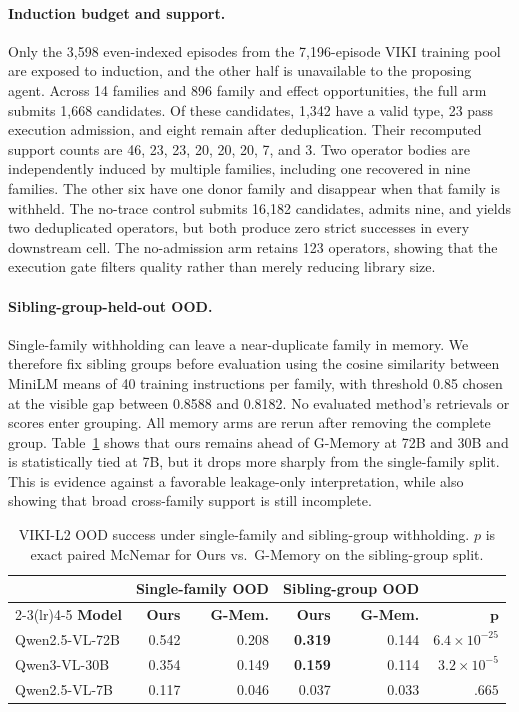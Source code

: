 \documentclass{article}
\theoremstyle{plain}
\theoremstyle{definition}
\theoremstyle{remark}
\begin{document}
\paragraph{Induction budget and support.}
Only the 3{,}598 even-indexed episodes from the 7{,}196-episode VIKI training pool are exposed to induction, and the other half is unavailable to the proposing agent. Across 14 families and 896 family and effect opportunities, the full arm submits 1{,}668 candidates. Of these candidates, 1{,}342 have a valid type, 23 pass execution admission, and eight remain after deduplication. Their recomputed support counts are 46, 23, 23, 20, 20, 20, 7, and 3. Two operator bodies are independently induced by multiple families, including one recovered in nine families. The other six have one donor family and disappear when that family is withheld. The no-trace control submits 16{,}182 candidates, admits nine, and yields two deduplicated operators, but both produce zero strict successes in every downstream cell. The no-admission arm retains 123 operators, showing that the execution gate filters quality rather than merely reducing library size.

\paragraph{Sibling-group-held-out OOD.}
Single-family withholding can leave a near-duplicate family in memory. We therefore fix sibling groups before evaluation using the cosine similarity between MiniLM means of 40 training instructions per family, with threshold 0.85 chosen at the visible gap between 0.8588 and 0.8182. No evaluated method's retrievals or scores enter grouping. All memory arms are rerun after removing the complete group. Table~\ref{tab:sibling_ood} shows that ours remains ahead of G-Memory at 72B and 30B and is statistically tied at 7B, but it drops more sharply from the single-family split. This is evidence against a favorable leakage-only interpretation, while also showing that broad cross-family support is still incomplete.

\begin{table}[h]
\centering
\caption{VIKI-L2 OOD success under single-family and sibling-group withholding. $p$ is exact paired McNemar for Ours vs.\ G-Memory on the sibling-group split.}
\label{tab:sibling_ood}
\begin{tabular}{@{}lrrrrr@{}}
\toprule
& \multicolumn{2}{c}{\textbf{Single-family OOD}} & \multicolumn{2}{c}{\textbf{Sibling-group OOD}} & \\
\cmidrule(lr){2-3}\cmidrule(lr){4-5}
\textbf{Model} & \textbf{Ours} & \textbf{G-Mem.} & \textbf{Ours} & \textbf{G-Mem.} & $\boldsymbol{p}$ \\
\midrule
Qwen2.5-VL-72B & 0.542 & 0.208 & \textbf{0.319} & 0.144 & $6.4\!\times\!10^{-25}$ \\
Qwen3-VL-30B   & 0.354 & 0.149 & \textbf{0.159} & 0.114 & $3.2\!\times\!10^{-5}$ \\
Qwen2.5-VL-7B  & 0.117 & 0.046 & 0.037 & 0.033 & $.665$ \\
\bottomrule
\end{tabular}
\end{table}
\end{document}
